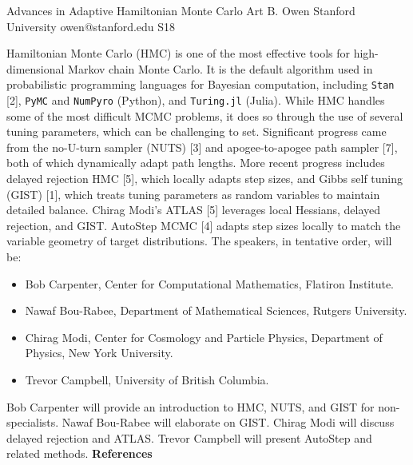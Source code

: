 \begin{session}
 {Advances in Adaptive Hamiltonian Monte Carlo}%
 {Art B. Owen}%
 {Stanford University}%
 {owen@stanford.edu}%
{}{}{}
 {S18}%
{}

 Hamiltonian Monte Carlo (HMC) is one of the most effective tools for high-dimensional Markov chain Monte Carlo. It is the default algorithm used in probabilistic programming languages for Bayesian computation, including \texttt{Stan} [2], \texttt{PyMC} and \texttt{NumPyro} (Python), and \texttt{Turing.jl} (Julia).  While HMC handles some of the most difficult MCMC problems, it does so through the use of several tuning parameters, which can be challenging to set.
 Significant progress came from the no-U-turn sampler (NUTS) [3] and apogee-to-apogee path sampler [7], both of which dynamically adapt path lengths. More recent progress includes delayed rejection HMC [5], which locally adapts step sizes, and
 Gibbs self tuning (GIST) [1], which treats tuning parameters as random variables to maintain detailed balance.  Chirag Modi's ATLAS [5] leverages local Hessians, delayed rejection, and GIST.  AutoStep MCMC [4] adapts step sizes locally to match the variable geometry of target distributions.
 The speakers, in tentative order, will be: \\[-5ex]
 \begin{itemize}
 \item Bob Carpenter, Center for Computational Mathematics, Flatiron Institute. \\[-4ex]
 \item Nawaf Bou-Rabee, Department of Mathematical Sciences, Rutgers University. \\[-4ex]
 \item Chirag Modi, Center for Cosmology and Particle Physics, Department of Physics, New York University. \\[-4ex]
 \item Trevor Campbell, University of British Columbia.\\[-4ex]
 \end{itemize}
 Bob Carpenter will provide an introduction to HMC, NUTS, and GIST for non-specialists. Nawaf Bou-Rabee will elaborate on GIST. Chirag Modi will discuss delayed rejection and ATLAS. Trevor Campbell will present AutoStep and related methods.
 \medskip
 {\bf\large References}\\[-5ex]
 \begin{description}

\end{description}
\end{session}
